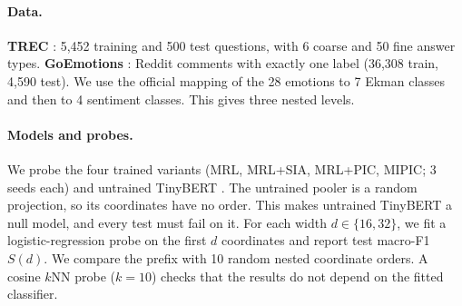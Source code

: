 \documentclass[11pt]{article}
\begin{document}
\paragraph{Data.}
\textbf{TREC} \citep{li-roth-2002-learning}: 5,452 training and 500 test questions, with 6 coarse and 50 fine answer types.
\textbf{GoEmotions} \citep{demszky-etal-2020-goemotions}: Reddit comments with exactly one label (36,308 train, 4,590 test).
We use the official mapping of the 28 emotions to 7 Ekman classes and then to 4 sentiment classes.
This gives three nested levels.

\paragraph{Models and probes.}
We probe the four trained variants (MRL, MRL+SIA, MRL+PIC, MIPIC; 3 seeds each) and untrained TinyBERT \citep{jiao-etal-2020-tinybert}.
The untrained pooler is a random projection, so its coordinates have no order.
This makes untrained TinyBERT a null model, and every test must fail on it.
For each width $d\in\{16,32\}$, we fit a logistic-regression probe on the first $d$ coordinates and report test macro-F1 $S(d)$.
We compare the prefix with 10 random nested coordinate orders.
A cosine $k$NN probe ($k{=}10$) checks that the results do not depend on the fitted classifier.
\end{document}
